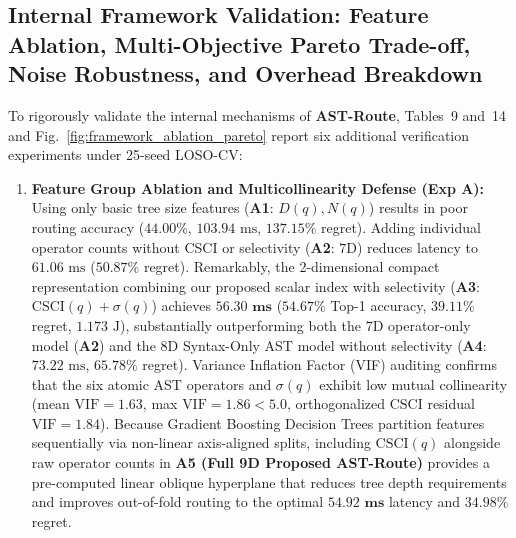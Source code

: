 \documentclass[10pt,a4paper]{article}
\begin{document}
\subsection{Internal Framework Validation: Feature Ablation, Multi-Objective Pareto Trade-off, Noise Robustness, and Overhead Breakdown}
To rigorously validate the internal mechanisms of \textbf{AST-Route}, Tables~9 and~14 and Fig.~\ref{fig:framework_ablation_pareto} report six additional verification experiments under 25-seed LOSO-CV:
\begin{enumerate}[leftmargin=1.5em,itemsep=2pt]
    \item \textbf{Feature Group Ablation and Multicollinearity Defense (Exp A):} Using only basic tree size features (\textbf{A1}: $D(q), N(q)$) results in poor routing accuracy ($44.00\%$, $103.94\text{ ms}$, $137.15\%$ regret). Adding individual operator counts without CSCI or selectivity (\textbf{A2}: $7\text{D}$) reduces latency to $61.06\text{ ms}$ ($50.87\%$ regret). Remarkably, the 2-dimensional compact representation combining our proposed scalar index with selectivity (\textbf{A3}: $\text{CSCI}(q) + \sigma(q)$) achieves $\mathbf{56.30\text{ ms}}$ ($54.67\%$ Top-1 accuracy, $39.11\%$ regret, $1.173\text{ J}$), substantially outperforming both the 7D operator-only model (\textbf{A2}) and the 8D Syntax-Only AST model without selectivity (\textbf{A4}: $73.22\text{ ms}$, $65.78\%$ regret). Variance Inflation Factor (VIF) auditing confirms that the six atomic AST operators and $\sigma(q)$ exhibit low mutual collinearity (mean $\text{VIF} = 1.63$, max $\text{VIF} = 1.86 < 5.0$, orthogonalized $\text{CSCI}$ residual $\text{VIF} = 1.84$). Because Gradient Boosting Decision Trees partition features sequentially via non-linear axis-aligned splits, including $\text{CSCI}(q)$ alongside raw operator counts in \textbf{A5 (Full 9D Proposed AST-Route)} provides a pre-computed linear oblique hyperplane that reduces tree depth requirements and improves out-of-fold routing to the optimal $\mathbf{54.92\text{ ms}}$ latency and $\mathbf{34.98\%}$ regret.

\end{enumerate}
\end{document}
